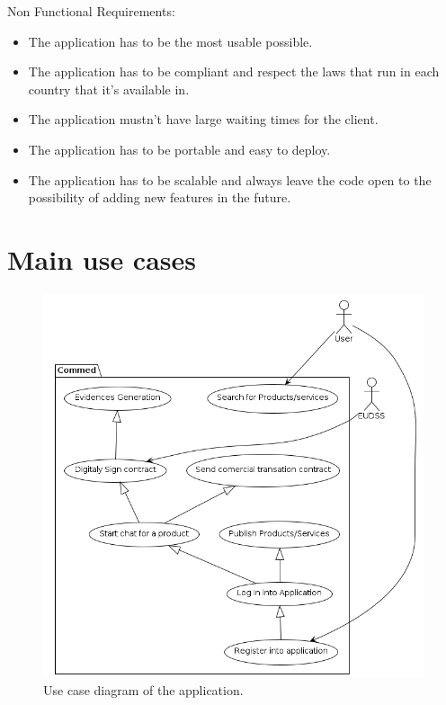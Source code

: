 \documentclass[./main.tex]{subfiles}
\begin{document}
Non Functional Requirements:

\begin{itemize}

\item
  The application has to be the most usable possible.
\item
  The application has to be compliant and respect the laws that run in
  each country that it's available in.
\item
  The application mustn't have large waiting times for the client.
\item
  The application has to be portable and easy to deploy.
\item
  The application has to be scalable and always leave the code open to
  the possibility of adding new features in the future.
\end{itemize}

\section{Main use cases}

\begin{figure}[h]
\centering
\includegraphics[width=\linewidth]{use_case_diagram/usecase_diagram.png}
\caption{Use case diagram of the application.}
\end{figure}
\end{document}
